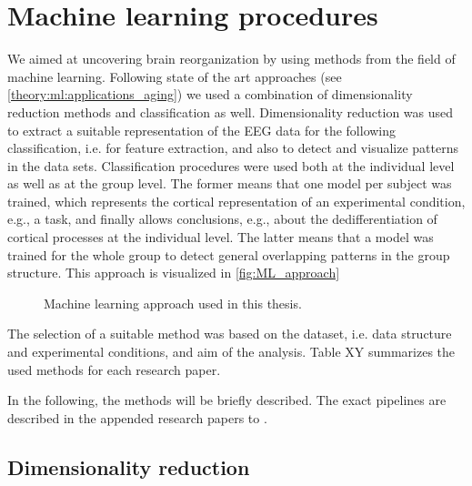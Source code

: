 \section{Machine learning procedures} 
We aimed at uncovering brain reorganization by using methods from the field of machine learning. Following state of the art approaches (see \autoref{theory:ml:applications_aging}) we used a combination of dimensionality reduction methods and classification as well. Dimensionality reduction was used to extract a suitable representation of the EEG data for the following classification, i.e. for feature extraction, and also to detect and visualize patterns in the data sets. Classification procedures were used both at the individual level as well as at the group level. The former means that one model per subject was trained, which represents the cortical representation of an experimental condition, e.g., a task, and finally allows conclusions, e.g., about the dedifferentiation of cortical processes at the individual level. The latter means that a model was trained for the whole group to detect general overlapping patterns in the group structure. This approach is visualized in \autoref{fig:ML_approach} 
\begin{figure}[h]
\begin{center}

\caption[Machine learning approach used in this thesis]{Machine learning approach used in this thesis.}
\label{fig:ML_approach}
\end{center}
\end{figure}

The selection of a suitable method was based on the dataset, i.e. data structure and experimental conditions, and aim of the analysis. Table XY summarizes the used methods for each research paper.


In the following, the methods will be briefly described. The exact pipelines are described in the appended research papers  to .

\subsection{Dimensionality reduction}

